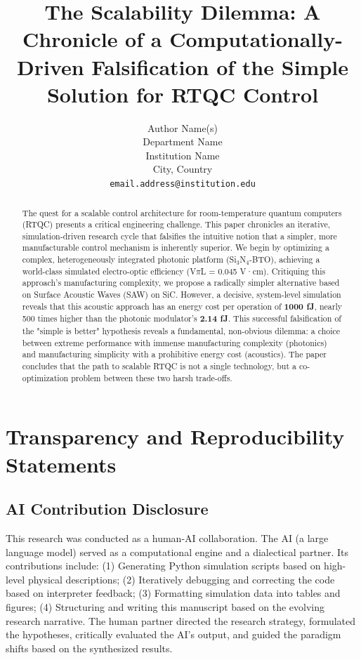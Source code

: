 \documentclass{article}
\title{The Scalability Dilemma: A Chronicle of a Computationally-Driven Falsification of the Simple Solution for RTQC Control}
\author{%
  Author Name(s) \\
  Department Name \\
  Institution Name \\
  City, Country \\
  \texttt{email.address@institution.edu} \\
}
\begin{document}

\maketitle

\begin{abstract}
The quest for a scalable control architecture for room-temperature quantum computers (RTQC) presents a critical engineering challenge. This paper chronicles an iterative, simulation-driven research cycle that falsifies the intuitive notion that a simpler, more manufacturable control mechanism is inherently superior. We begin by optimizing a complex, heterogeneously integrated photonic platform (Si$_3$N$_4$-BTO), achieving a world-class simulated electro-optic efficiency (V$\pi$L = 0.045 V·cm). Critiquing this approach's manufacturing complexity, we propose a radically simpler alternative based on Surface Acoustic Waves (SAW) on SiC. However, a decisive, system-level simulation reveals that this acoustic approach has an energy cost per operation of \textbf{1000 fJ}, nearly 500 times higher than the photonic modulator's \textbf{2.14 fJ}. This successful falsification of the "simple is better" hypothesis reveals a fundamental, non-obvious dilemma: a choice between extreme performance with immense manufacturing complexity (photonics) and manufacturing simplicity with a prohibitive energy cost (acoustics). The paper concludes that the path to scalable RTQC is not a single technology, but a co-optimization problem between these two harsh trade-offs.
\end{abstract}

\section{Transparency and Reproducibility Statements}

\subsection{AI Contribution Disclosure}
This research was conducted as a human-AI collaboration. The AI (a large language model) served as a computational engine and a dialectical partner. Its contributions include: (1) Generating Python simulation scripts based on high-level physical descriptions; (2) Iteratively debugging and correcting the code based on interpreter feedback; (3) Formatting simulation data into tables and figures; (4) Structuring and writing this manuscript based on the evolving research narrative. The human partner directed the research strategy, formulated the hypotheses, critically evaluated the AI's output, and guided the paradigm shifts based on the synthesized results.
\end{document}
